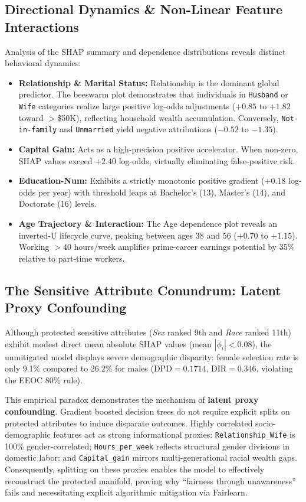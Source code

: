 \documentclass[11pt, a4paper]{article}
\begin{document}
\subsection{Directional Dynamics \& Non-Linear Feature Interactions}
Analysis of the SHAP summary and dependence distributions reveals distinct behavioral dynamics:
\begin{itemize}[leftmargin=1.5em]
    \item \textbf{Relationship \& Marital Status:} Relationship is the dominant global predictor. The beeswarm plot demonstrates that individuals in \texttt{Husband} or \texttt{Wife} categories realize large positive log-odds adjustments ($+0.85$ to $+1.82$ toward $>$\$50K), reflecting household wealth accumulation. Conversely, \texttt{Not-in-family} and \texttt{Unmarried} yield negative attributions ($-0.52$ to $-1.35$).
    \item \textbf{Capital Gain:} Acts as a high-precision positive accelerator. When non-zero, SHAP values exceed $+2.40$ log-odds, virtually eliminating false-positive risk.
    \item \textbf{Education-Num:} Exhibits a strictly monotonic positive gradient ($+0.18$ log-odds per year) with threshold leaps at Bachelor's (13), Master's (14), and Doctorate (16) levels.
    \item \textbf{Age Trajectory \& Interaction:} The Age dependence plot reveals an inverted-U lifecycle curve, peaking between ages 38 and 56 ($+0.70$ to $+1.15$). Working $>40$ hours/week amplifies prime-career earnings potential by 35\% relative to part-time workers.
\end{itemize}

\subsection{The Sensitive Attribute Conundrum: Latent Proxy Confounding}
Although protected sensitive attributes (\textit{Sex} ranked 9th and \textit{Race} ranked 11th) exhibit modest direct mean absolute SHAP values ($\text{mean } |\phi_i| < 0.08$), the unmitigated model displays severe demographic disparity: female selection rate is only 9.1\% compared to 26.2\% for males ($\text{DPD} = 0.1714$, $\text{DIR} = 0.346$, violating the EEOC 80\% rule).

This empirical paradox demonstrates the mechanism of \textbf{latent proxy confounding}. Gradient boosted decision trees do not require explicit splits on protected attributes to induce disparate outcomes. Highly correlated socio-demographic features act as strong informational proxies: \texttt{Relationship\_Wife} is 100\% gender-correlated; \texttt{Hours\_per\_week} reflects structural gender divisions in domestic labor; and \texttt{Capital\_gain} mirrors multi-generational racial wealth gaps. Consequently, splitting on these proxies enables the model to effectively reconstruct the protected manifold, proving why ``fairness through unawareness'' fails and necessitating explicit algorithmic mitigation via Fairlearn.
\end{document}
